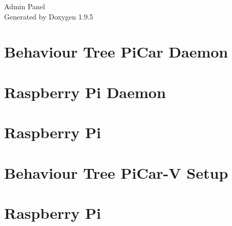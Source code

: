 \documentclass[twoside]{book}
\newcommand{\+}{\discretionary{\mbox{\scriptsize$\hookleftarrow$}}{}{}}
\newcommand{\clearemptydoublepage}{%
    \newpage{\pagestyle{empty}\cleardoublepage}%
  }
\begin{document}
  \raggedbottom
    \hypersetup{pageanchor=false,
                bookmarksnumbered=true,
                pdfencoding=unicode
               }
  \begin{titlepage}
  \vspace*{7cm}
  \begin{center}%
  {\Large Admin Panel}\\
  \vspace*{1cm}
  {\large Generated by Doxygen 1.9.5}\\
  \end{center}
  \end{titlepage}
  \clearemptydoublepage
  \tableofcontents
  \clearemptydoublepage
  \hypersetup{pageanchor=true}
\chapter{Behaviour Tree Pi\+Car Daemon}
\label{md__github_workspace_app_rpi_daemon_install_README}

\chapter{Raspberry Pi Daemon}
\label{md__github_workspace_app_rpi_daemon_README}

\chapter{Raspberry Pi}
\label{md__github_workspace_app_rpi_README}

\chapter{Behaviour Tree Pi\+Car-\/V Setup}
\label{md__github_workspace_app_rpi_SETUP}

\chapter{Raspberry Pi}
\label{md__github_workspace_app_rpi_tui_README}

\end{document}
